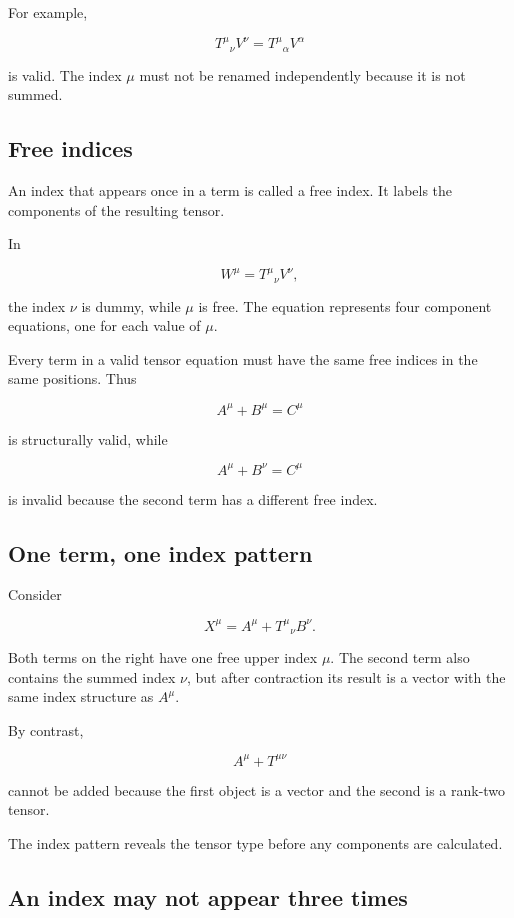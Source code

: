 For example,

\[
T^{\mu}{}_{\nu}V^{\nu}
=
T^{\mu}{}_{\alpha}V^{\alpha}
\]

is valid. The index \(\mu\) must not be renamed independently because it is not summed.

\subsection{Free indices}

An index that appears once in a term is called a free index. It labels the components of the resulting tensor.

In

\[
W^{\mu}
=
T^{\mu}{}_{\nu}V^{\nu},
\]

the index \(\nu\) is dummy, while \(\mu\) is free. The equation represents four component equations, one for each value of \(\mu\).

Every term in a valid tensor equation must have the same free indices in the same positions. Thus

\[
A^{\mu}+B^{\mu}=C^{\mu}
\]

is structurally valid, while

\[
A^{\mu}+B^{\nu}=C^{\mu}
\]

is invalid because the second term has a different free index.

\subsection{One term, one index pattern}

Consider

\[
X^{\mu}
=
A^{\mu}
+
T^{\mu}{}_{\nu}B^{\nu}.
\]

Both terms on the right have one free upper index \(\mu\). The second term also contains the summed index \(\nu\), but after contraction its result is a vector with the same index structure as \(A^{\mu}\).

By contrast,

\[
A^{\mu}
+
T^{\mu\nu}
\]

cannot be added because the first object is a vector and the second is a rank-two tensor.

The index pattern reveals the tensor type before any components are calculated.

\subsection{An index may not appear three times}

